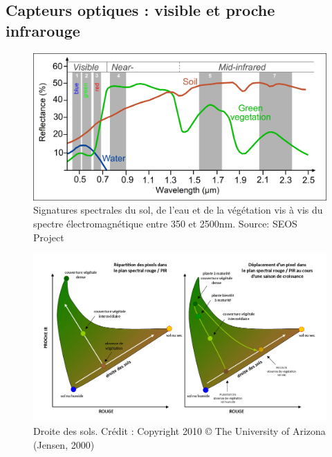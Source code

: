 \documentclass[11pt]{beamer}
\begin{document}
\subsection{Capteurs optiques : visible et proche infrarouge}
\begin{frame}{}
\begin{figure}[!h]
\centering
\includegraphics[scale=0.38]{img/spectral_signatures.jpg}
\caption{Signatures spectrales du sol, de l'eau et de la végétation vis à vis du spectre électromagnétique entre 350 et 2500nm. Source: SEOS Project}
\label{signSpectr}
\end{figure}
\end{frame}

\begin{frame}{}
\begin{figure}[!h]
\centering
\includegraphics[scale=0.45]{img/droite_sols.png}
\caption{Droite des sols. Crédit : Copyright 2010 © The University of Arizona (Jensen, 2000)}
\label{signSpectr}
\end{figure}
\end{frame}
\end{document}
